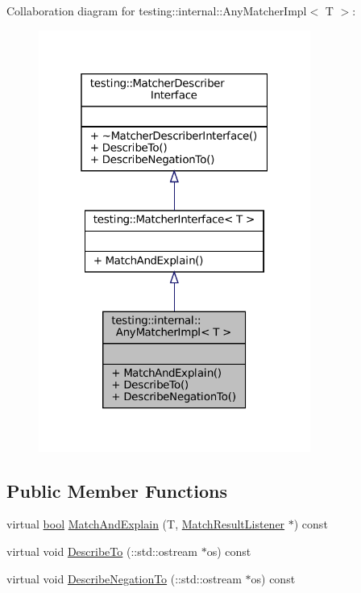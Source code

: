 Collaboration diagram for testing\+:\+:internal\+:\+:Any\+Matcher\+Impl$<$ T $>$\+:
\nopagebreak
\begin{figure}[H]
\begin{center}
\leavevmode
\includegraphics[width=253pt]{classtesting_1_1internal_1_1AnyMatcherImpl__coll__graph}
\end{center}
\end{figure}
\subsection*{Public Member Functions}
\begin{DoxyCompactItemize}
\item 
virtual \hyperlink{classbool}{bool} \hyperlink{classtesting_1_1internal_1_1AnyMatcherImpl_ac2d8f01b1c8ede16295f03eda91c5de1}{Match\+And\+Explain} (T, \hyperlink{classtesting_1_1MatchResultListener}{Match\+Result\+Listener} $\ast$) const
\item 
virtual void \hyperlink{classtesting_1_1internal_1_1AnyMatcherImpl_a743f037083cc9992a4cc0d4e9842bc86}{Describe\+To} (\+::std\+::ostream $\ast$os) const
\item 
virtual void \hyperlink{classtesting_1_1internal_1_1AnyMatcherImpl_ac6570e881174ba774b8d56abaa4f7d25}{Describe\+Negation\+To} (\+::std\+::ostream $\ast$os) const
\end{DoxyCompactItemize}


